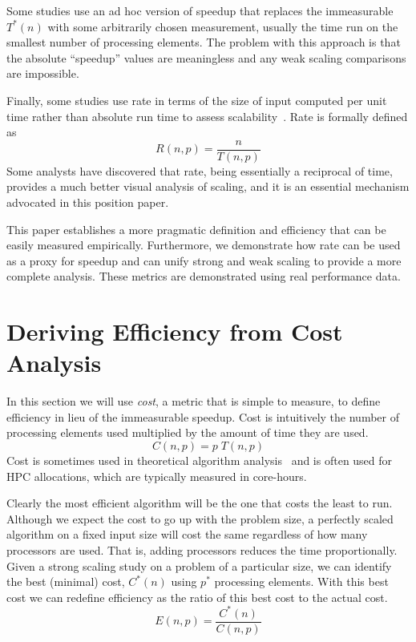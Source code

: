\documentclass{llncs}
\newcommand*{\lcite}[1]{~\cite{#1}}
\newcommand*{\keyterm}[1]{\emph{#1}}
\begin{document}
Some studies use an ad hoc version of speedup that replaces the
immeasurable $T^*(n)$ with some arbitrarily chosen measurement, usually the
time run on the smallest number of processing elements. The problem with
this approach is that the absolute ``speedup'' values are meaningless and
any weak scaling comparisons are impossible.

Finally, some studies use rate in terms of the size of input computed per
unit time rather than absolute run time to assess
scalability\lcite{Kaminsky2014}. Rate is formally defined as
\begin{equation}
  R(n,p) = \frac{n}{T(n,p)}
  \label{eq:Rate}
\end{equation}
Some analysts have discovered that rate, being essentially a reciprocal of
time, provides a much better visual analysis of scaling, and it is
an essential mechanism advocated in this position paper.

This paper establishes a more pragmatic definition and efficiency that can
be easily measured empirically. Furthermore, we demonstrate how rate can be
used as a proxy for speedup and can unify strong and weak scaling to
provide a more complete analysis. These metrics are demonstrated using real
performance data.


\section{Deriving Efficiency from Cost Analysis}
\label{sec:CostAnalysis}

\noindent
In this section we will use \keyterm{cost}, a metric that is simple to
measure, to define efficiency in lieu of the immeasurable speedup. Cost is
intuitively the number of processing elements used multiplied by the amount
of time they are used.
\begin{equation}
  C(n,p) = p \; T(n,p)
  \label{eq:Cost}
\end{equation}
Cost is sometimes used in theoretical algorithm analysis\lcite{JaJa1992}
and is often used for HPC allocations, which are typically measured in
core-hours.

Clearly the most efficient algorithm will be the one that costs the least
to run. Although we expect the cost to go up with the problem size, a
perfectly scaled algorithm on a fixed input size will cost the same
regardless of how many processors are used. That is, adding processors
reduces the time proportionally. Given a strong scaling study on a problem
of a particular size, we can identify the best (minimal) cost, $C^*(n)$
using $p^*$ processing elements. With this best cost we can redefine
efficiency as the ratio of this best cost to the actual cost.
\begin{equation}
  E(n,p) = \frac{C^*(n)}{C(n,p)}
  \label{eq:EfficiencyCost}
\end{equation}
\end{document}
